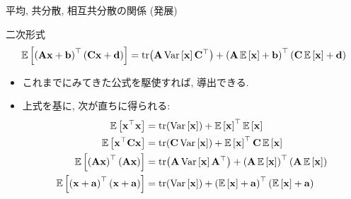 \documentclass[dvipdfmx,notheorems,t]{beamer}
\begin{document}
\begin{frame}{平均, 共分散, 相互共分散の関係 (発展)}
\begin{block}{二次形式}
  {\small \begin{align*}
    \E{\left( \vb{A} \vb{x} + \vb{b} \right)^\top \left( \vb{C} \vb{x} + \vb{d} \right)}
      = \tr(\vb{A} \Var{\vb{x}} \vb{C}^\top)
      + \left( \vb{A} \E{\vb{x}} + \vb{b} \right)^\top
        \left( \vb{C} \E{\vb{x}} + \vb{d} \right)
  \end{align*}}
\end{block}

\begin{itemize}
  \item これまでにみてきた公式を駆使すれば, 導出できる.
  \item 上式を基に, 次が直ちに得られる:
  \begin{align*}
    \E{\vb{x}^\top \vb{x}} &= \tr(\Var{\vb{x}}) + \E{\vb{x}}^\top \E{\vb{x}} \\
    \E{\vb{x}^\top \vb{C} \vb{x}} &= \tr(\vb{C} \Var{\vb{x}}) + \E{\vb{x}}^\top \vb{C} \E{\vb{x}} \\
    \E{\left( \vb{A} \vb{x} \right)^\top \left( \vb{A} \vb{x} \right)}
      &= \tr(\vb{A} \Var{\vb{x}} \vb{A}^\top)
      + \left( \vb{A} \E{\vb{x}} \right)^\top \left( \vb{A} \E{\vb{x}} \right) \\
    \E{\left( \vb{x} + \vb{a} \right)^\top \left( \vb{x} + \vb{a} \right)}
      &= \tr(\Var{\vb{x}}) + \left( \E{\vb{x}} + \vb{a} \right)^\top \left( \E{\vb{x}} + \vb{a} \right)
  \end{align*}
\end{itemize}
\end{frame}
\end{document}
